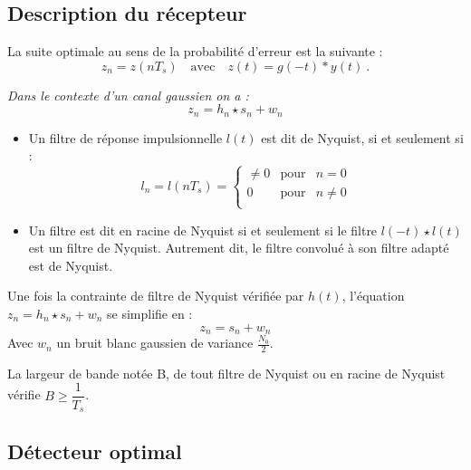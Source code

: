 \subsection{Description du récepteur}

	\begin{pop}
		La suite optimale au sens de la probabilité d'erreur est la suivante :
		$$z_{n} = z(nT_{s}) \quad \text{avec} \quad z(t)=g(-t)*y(t)\ .$$
	\end{pop}
	
	\begin{pop}
	\textit{Dans le contexte d'un canal gaussien on a : }
	$$z_{n} = h_{n} \star s_{n} + w_{n}$$
	\end{pop}
	
	\begin{defn}
	
		\begin{itemize}
		
		\item Un filtre de réponse impulsionnelle $l(t)$ est dit de Nyquist, si et seulement si :
		$$l_{n} = l(nT_{s}) =
		\left\{ \begin{array}{rcr}
			\neq 0 & \text{pour} & n = 0 \\
			0      & \text{pour} & n \neq 0 \\
		\end{array} \right.$$
		\item Un filtre est dit en racine de Nyquist si et seulement si le filtre $l(-t)\star l(t)$ est un filtre de Nyquist. Autrement dit, le filtre convolué à son filtre adapté est de Nyquist.
		\end{itemize}
	\end{defn}
	
	\begin{pop}
		Une fois la contrainte de filtre de Nyquist vérifiée par $h(t)$, l'équation $z_{n} = h_{n} \star s_{n} + w_{n}$ se simplifie en :
		$$z_{n} = s_{n} + w_{n}$$
		Avec $w_n$ un bruit blanc gaussien de variance $\frac{N_0}{2}$.
	\end{pop}
	
	\begin{pop}
		La largeur de bande notée B, de tout filtre de Nyquist ou en racine de Nyquist vérifie $B\geq \dfrac{1}{T_{s}}$.
	\end{pop}
	
\subsection{Détecteur optimal}

